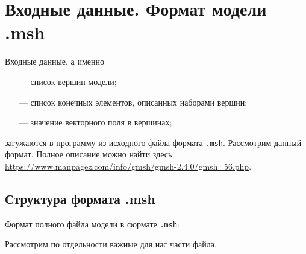 \section{Входные данные. Формат модели .msh}
Входные данные, а именно
\begin{enumerate}
	\item[---] список вершин модели;
	\item[---] список конечных элементов, описанных наборами вершин;
	\item[---] значение векторного поля в вершинах;
\end{enumerate}
загужаются в программу из исходного файла формата \verb|.msh|. Рассмотрим данный формат. Полное описание можно найти здесь \url{https://www.manpagez.com/info/gmsh/gmsh-2.4.0/gmsh_56.php}.
\subsection{Структура формата .msh}
Формат полного файла модели в формате \verb|.msh|:

Рассмотрим по отдельности важные для нас части файла.
